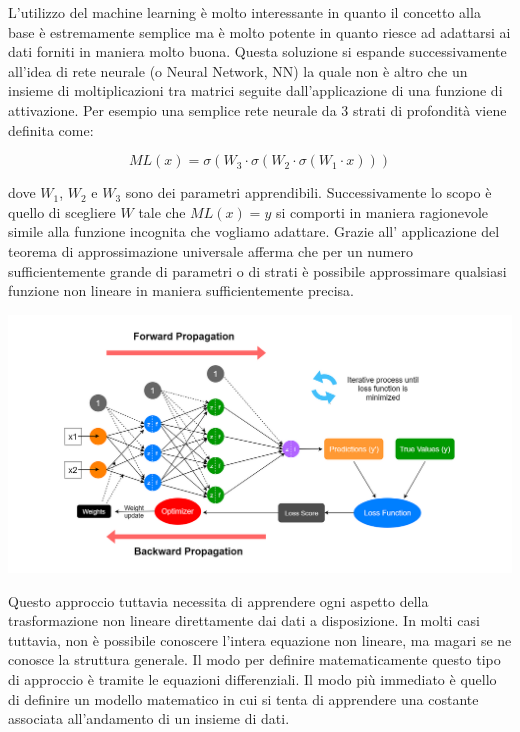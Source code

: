 L'utilizzo del machine learning è molto interessante in quanto il concetto 
alla base è estremamente semplice ma è molto potente in quanto riesce ad 
adattarsi ai dati forniti in maniera molto buona. Questa soluzione si espande 
successivamente all'idea di rete neurale (o Neural Network, NN) la quale 
non è altro che un insieme di moltiplicazioni tra matrici seguite
dall'applicazione di una funzione di attivazione. Per esempio una semplice 
rete neurale da 3 strati di profondità viene definita come:

$$ML(x) = \sigma(W_3 \cdot \sigma(W_2 \cdot \sigma(W_1 \cdot x)))$$

dove $W_1$, $W_2$ e $W_3$ sono dei parametri apprendibili. Successivamente 
lo scopo è quello di scegliere $W$ tale che $ML(x) = y$ si comporti in maniera
ragionevole simile alla funzione incognita che vogliamo adattare. Grazie all'
applicazione del teorema di approssimazione universale 
afferma che per un numero sufficientemente grande di parametri o di strati 
è possibile approssimare qualsiasi funzione non lineare in maniera 
sufficientemente precisa. 

\begin{minipage}{\linewidth}
    \centering
    \includegraphics[width=\textwidth]{img/1_ZXAOUqmlyECgfVa81Sr6Ew.png}
    \label{fig:NN_example}
\end{minipage}

Questo approccio tuttavia necessita di apprendere ogni aspetto della 
trasformazione non lineare direttamente dai dati a disposizione. In molti 
casi tuttavia, non è possibile conoscere l'intera equazione non lineare, 
ma magari se ne conosce la struttura generale. Il modo per definire 
matematicamente questo tipo di approccio è tramite le equazioni differenziali.
Il modo più immediato è quello di definire un modello matematico in 
cui si tenta di apprendere una costante associata all'andamento di un 
insieme di dati. 


